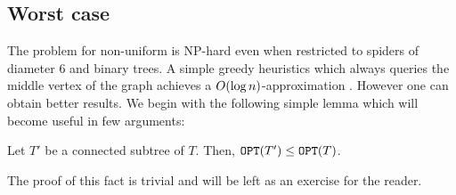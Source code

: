 \subsection{Worst case}

The problem for non-uniform is NP-hard even when restricted to spiders of diameter $6$ and binary trees.
A simple greedy heuristics which always queries the middle vertex of the graph achieves a $O\mathopen{}\left( \log n \right)$-approximation \cite{Dereniowski2009ERankOfWTs}. However one can obtain better results. 
We begin with the following simple lemma which will become useful in few arguments:
\begin{lemma}\label{lemma:subtreeCost}
    Let $T'$ be a connected subtree of $T$. Then, $\texttt{OPT}\mathopen{}\left( T' \right)\leq\texttt{OPT}\mathopen{}\left( T \right)$.
\end{lemma}
The proof of this fact is trivial and will be left as an exercise for the reader.
